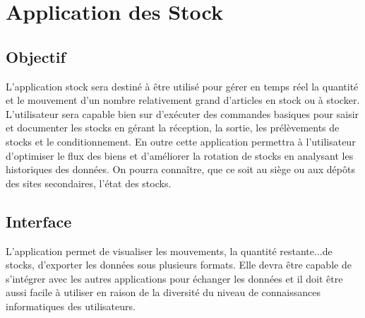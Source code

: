 \section{Application des Stock}
	\subsection{Objectif}
	L'application stock sera destiné à être utilisé pour gérer en temps réel la quantité et le mouvement d'un nombre relativement grand d'articles en stock ou à stocker. L'utilisateur sera capable bien sur d'exécuter des commandes basiques pour saisir et documenter les stocks en gérant la réception, la sortie, les prélèvements de stocks et le conditionnement. En outre cette application permettra à l'utilisateur d'optimiser le flux des biens et d'améliorer la rotation de stocks en analysant les historiques des données. On pourra connaître, que ce soit au siège ou aux dépôts des sites secondaires, l'état des stocks.

	\subsection{Interface}
	L'application permet de visualiser les mouvements, la quantité restante...de stocks, d'exporter les données sous plusieurs formats. Elle devra être capable de s'intégrer avec les autres applications pour échanger les données et il doit être aussi facile à utiliser en raison de la diversité du niveau de connaissances informatiques des utilisateurs.

